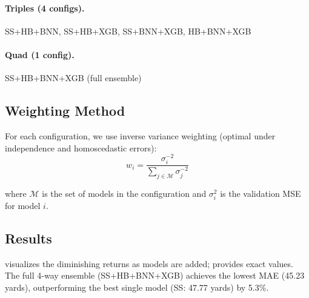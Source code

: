 \paragraph{Triples (4 configs).}
SS+HB+BNN, SS+HB+XGB, SS+BNN+XGB, HB+BNN+XGB

\paragraph{Quad (1 config).}
SS+HB+BNN+XGB (full ensemble)

\subsection{Weighting Method}

For each configuration, we use inverse variance weighting (optimal under independence and homoscedastic errors):
\begin{equation}
  w_i = \frac{\sigma_i^{-2}}{\sum_{j \in \mathcal{M}} \sigma_j^{-2}}
\end{equation}

where $\mathcal{M}$ is the set of models in the configuration and $\sigma_i^2$ is the validation MSE for model $i$.

\subsection{Results}

 visualizes the diminishing returns as models are added;  provides exact values. The full 4-way ensemble (SS+HB+BNN+XGB) achieves the lowest MAE (45.23 yards), outperforming the best single model (SS: 47.77 yards) by 5.3\%.



